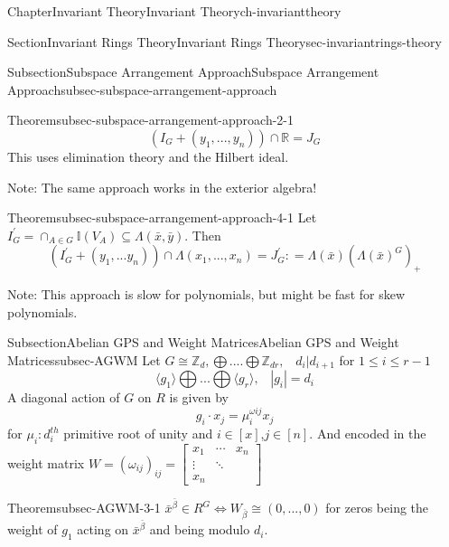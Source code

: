 \documentclass[oneside,10pt,]{book}
\newcommand{\R}{\mathbb R}
\newcommand{\amp}{&}
\begin{document}
\begin{chapterptx}{Chapter}{Invariant Theory}{}{Invariant Theory}{}{}{ch-invarianttheory}
\begin{sectionptx}{Section}{Invariant Rings Theory}{}{Invariant Rings Theory}{}{}{sec-invariantrings-theory}
\begin{subsectionptx}{Subsection}{Subspace Arrangement Approach}{}{Subspace Arrangement Approach}{}{}{subsec-subspace-arrangement-approach}
\begin{theorem}{Theorem}{}{}{subsec-subspace-arrangement-approach-2-1}
\begin{equation*}
(I_G +(y_1,...,y_n)) \cap \R = J_G
\end{equation*}
This uses elimination theory and the Hilbert ideal.%
\end{theorem}
%
\par
Note: The same approach works in the exterior algebra!%
\par
\begin{theorem}{Theorem}{}{}{subsec-subspace-arrangement-approach-4-1}%
Let \(I_G^{'} = \cap_{A\in G} \mathbb{I}(V_A) \subseteq \Lambda(\bar x, \bar y)\). Then%
\begin{equation*}
(I_G^{'} +(y_1,...y_n)) \cap \Lambda(x_1,...,x_n) = J_G^{'} : = \Lambda(\bar x)(\Lambda(\bar x)^G)_+
\end{equation*}
%
\end{theorem}
%
\par
Note: This approach is slow for polynomials, but might be fast for skew polynomials.%
\end{subsectionptx}
%
%
\typeout{************************************************}
\typeout{************************************************}
%
\begin{subsectionptx}{Subsection}{Abelian GPS and Weight Matrices}{}{Abelian GPS and Weight Matrices}{}{}{subsec-AGWM}
Let \(G \cong \mathbb{Z}_d, \bigoplus....\bigoplus \mathbb{Z}_{dr}, \,\,\,\,\, d_i|d_{i+1}\) for \(1 \leq i \leq r-1\)%
\begin{equation*}
\langle g_1\rangle \bigoplus...\bigoplus\langle g_r \rangle, \,\,\,\,\, |g_i| =d_i
\end{equation*}
A diagonal action of \(G\) on \(R\) is given by%
\begin{equation*}
g_i \cdot x_j = \mu_i^{\omega ij}x_j
\end{equation*}
for \(\mu_i : d_i^{th}\) primitive root of unity and \(i \in [x]\),\(j \in [n]\). And encoded in the weight matrix \(W = (\omega_{ij})_{ij} =  
\begin{bmatrix}
x_1 \amp \cdots     \amp   x_n   \\
\vdots \amp \ddots \amp      \\
x_n \amp      \amp
\end{bmatrix}\)%
\par
\begin{theorem}{Theorem}{}{}{subsec-AGWM-3-1}%
\(\bar x^{\bar \beta} \in R^G \iff W_{\bar \beta}\cong (0,...,0)\) for zeros being the weight of \(g_1\) acting on \(\bar x^{\bar \beta}\) and being modulo \(d_i\).%
\end{theorem}

\end{subsectionptx}
\end{sectionptx}
\end{chapterptx}
\end{document}
